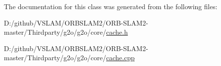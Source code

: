 The documentation for this class was generated from the following files\+:\begin{DoxyCompactItemize}
\item 
D\+:/github/\+V\+S\+L\+A\+M/\+O\+R\+B\+S\+L\+A\+M2/\+O\+R\+B-\/\+S\+L\+A\+M2-\/master/\+Thirdparty/g2o/g2o/core/\mbox{\hyperlink{cache_8h}{cache.\+h}}\item 
D\+:/github/\+V\+S\+L\+A\+M/\+O\+R\+B\+S\+L\+A\+M2/\+O\+R\+B-\/\+S\+L\+A\+M2-\/master/\+Thirdparty/g2o/g2o/core/\mbox{\hyperlink{cache_8cpp}{cache.\+cpp}}\end{DoxyCompactItemize}

